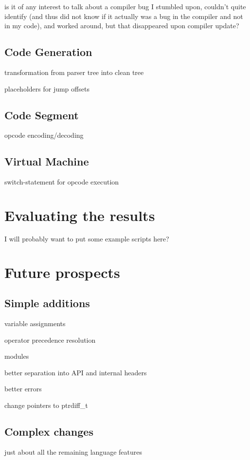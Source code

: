             is it of any interest to talk about a compiler bug I stumbled upon, couldn't quite identify (and thus did not know if it actually was a bug in the compiler and not in my code), and worked around, but that disappeared upon compiler update?
    
    \section{Code Generation}
    
        transformation from parser tree into clean tree
    
        placeholders for jump offsets
        
    \section{Code Segment}
        
        opcode encoding/decoding
        
    \section{Virtual Machine}
        
        switch-statement for opcode execution


\chapter{Evaluating the results}

I will probably want to put some example scripts here?

\chapter{Future prospects}

    \section{Simple additions}
        
        variable assignments
        
        operator precedence resolution
        
        modules
        
        better separation into API and internal headers
        
        better errors
        
        change pointers to ptrdiff\_t
    
    \section{Complex changes}
        
        just about all the remaining language features
